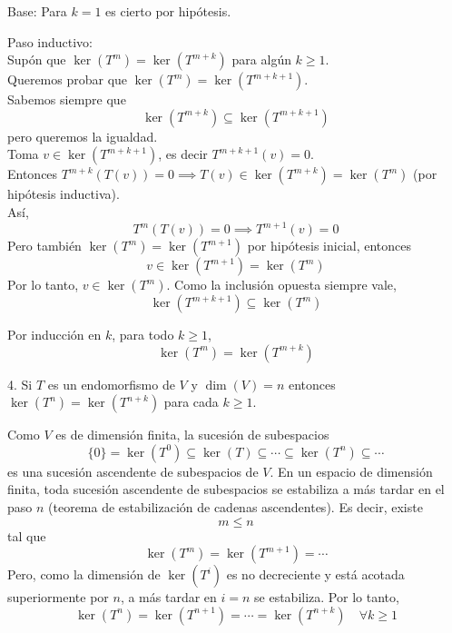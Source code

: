 \documentclass{article}
\theoremstyle{nonumberplain}
\begin{document}
Base: Para \( k = 1 \) es cierto por hipótesis.

Paso inductivo:   \\
Supón que \( \operatorname{ker}(T^{m}) = \operatorname{ker}(T^{m+k}) \) para algún \( k \geq 1 \).  \\ 
Queremos probar que \( \operatorname{ker}(T^{m}) = \operatorname{ker}(T^{m+k+1}) \). \\

Sabemos siempre que
\[
\operatorname{ker}(T^{m+k}) \subseteq \operatorname{ker}(T^{m+k+1})
\]
pero queremos la igualdad. \\

Toma \( v \in \operatorname{ker}(T^{m+k+1}) \), es decir \( T^{m+k+1}(v) = 0 \).   \\
Entonces \( T^{m+k}(T(v)) = 0 \implies T(v) \in \operatorname{ker}(T^{m+k}) = \operatorname{ker}(T^{m}) \) (por hipótesis inductiva). \\

Así,
\[
T^{m}(T(v)) = 0 \implies T^{m+1}(v) = 0
\]
Pero también \( \operatorname{ker}(T^{m}) = \operatorname{ker}(T^{m+1}) \) por hipótesis inicial, entonces
\[
v \in \operatorname{ker}(T^{m+1}) = \operatorname{ker}(T^{m})
\]
Por lo tanto, \( v \in \operatorname{ker}(T^{m}) \). Como la inclusión opuesta siempre vale,
\[
\operatorname{ker}(T^{m+k+1}) \subseteq \operatorname{ker}(T^{m})
\]

Por inducción en \( k \), para todo \( k \geq 1 \),
\[
\boxed{
\operatorname{ker}(T^{m}) = \operatorname{ker}(T^{m+k})
}
\]

4. Si \( T \) es un endomorfismo de \( V \) y \( \operatorname{dim}(V)=n \) entonces \( \operatorname{ker}\left(T^{n}\right)=\operatorname{ker}\left(T^{n+k}\right) \) para cada \( k \geq 1 \).

Como \( V \) es de dimensión finita, la sucesión de subespacios
\[
\{0\} = \operatorname{ker}(T^{0}) \subseteq \operatorname{ker}(T) \subseteq \cdots \subseteq \operatorname{ker}(T^{n}) \subseteq \cdots
\]
es una sucesión ascendente de subespacios de \( V \). En un espacio de dimensión finita, toda sucesión ascendente de subespacios se estabiliza a más tardar en el paso \( n \) (teorema de estabilización de cadenas ascendentes). Es decir, existe
\[
m \leq n
\]
tal que
\[
\operatorname{ker}(T^{m}) = \operatorname{ker}(T^{m+1}) = \cdots
\]
Pero, como la dimensión de \( \operatorname{ker}(T^{i}) \) es no decreciente y está acotada superiormente por \( n \), a más tardar en \( i = n \) se estabiliza. Por lo tanto,
\[
\operatorname{ker}(T^{n}) = \operatorname{ker}(T^{n+1}) = \cdots = \operatorname{ker}(T^{n+k}) \quad \forall k \geq 1
\]
\end{document}
